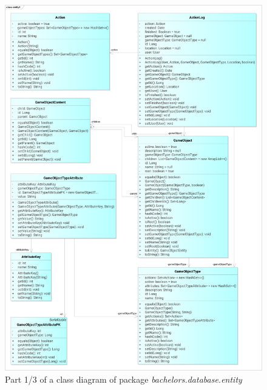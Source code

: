 \begin{figure}[h]	
	\includegraphics[width=\textwidth]{figures/classdiagrams/dsentity1}
	\centering			
	\caption{Part 1/3 of a class diagram of package \textit{bachelors.database.entity}}
\end{figure}

